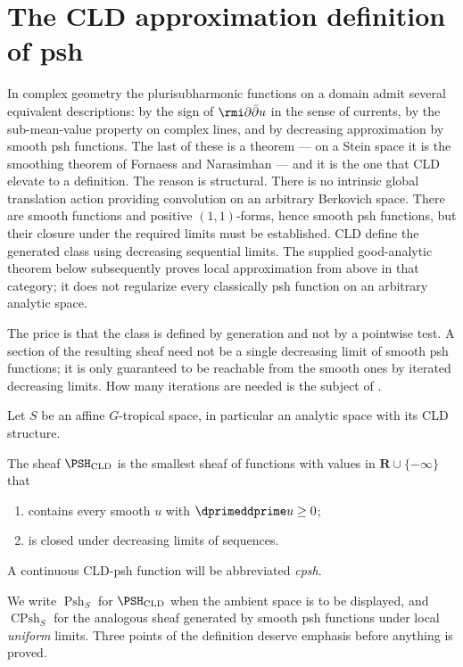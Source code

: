 \section{The CLD approximation definition of psh}
\label{sec:ch15-psh}

In complex geometry the plurisubharmonic functions on a domain admit several
equivalent descriptions: by the sign of $\rmi\partial\bar\partial u$ in the
sense of currents, by the sub-mean-value property on complex lines, and by
decreasing approximation by smooth psh functions.  The last of these is a
theorem --- on a Stein space it is the smoothing theorem of Fornaess and
Narasimhan \cite{FN80} --- and it is the one that CLD elevate to a
definition.  The reason is structural.  There is no intrinsic global
translation action providing convolution on an arbitrary Berkovich space.
There are smooth functions and positive $(1,1)$-forms, hence smooth psh
functions, but their closure under the required limits must be established.
CLD define the generated class using decreasing sequential limits.
The supplied good-analytic theorem below subsequently proves local
approximation from above in that category; it does not regularize every
classically psh function on an arbitrary analytic space.

The price is that the class is defined by generation and not by a pointwise
test.  A section of the resulting sheaf need not be a single decreasing limit
of smooth psh functions; it is only guaranteed to be reachable from the
smooth ones by iterated decreasing limits.  How many iterations are needed is
the subject of .

Let $S$ be an affine $G$-tropical space, in particular an analytic space with
its CLD structure.

\begin{definition}
\label{def:ch15-cld-psh}
The sheaf $\PSH_{\mathrm{CLD}}$ is the smallest sheaf of functions with
values in $\mathbf R\cup\{-\infty\}$ that
\begin{enumerate}
\item contains every smooth $u$ with $\dprimeddprime u\geq0$;
\item is closed under decreasing limits of sequences.
\end{enumerate}
A continuous CLD-psh function will be abbreviated \emph{cpsh}.
\end{definition}

We write $\operatorname{Psh}_S$ for $\PSH_{\mathrm{CLD}}$ when the ambient space is to be
displayed, and $\operatorname{CPsh}_S$ for the analogous sheaf generated by smooth psh
functions under local \emph{uniform} limits.  Three points of the definition
deserve emphasis before anything is proved.

